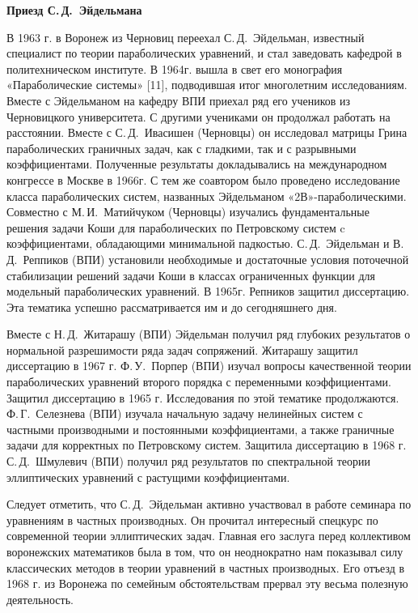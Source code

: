{\bf Приезд С.\,Д.~Эйдельмана}

В 1963 г. в Воронеж из Черновиц переехал С.\,Д.~Эйдельман, известный
специалист по теории параболических уравнений, и стал заведовать
кафедрой в политехническом институте. В 1964г. вышла в свет его монография «Параболические системы» [11], подводившая итог многолетним исследованиям. Вместе с Эйдельманом на кафедру ВПИ приехал ряд его учеников из Черновицкого университета. С другими учениками он продолжал работать на расстоянии. Вместе с С.\,Д.~Ивасишен (Черновцы) он исследовал матрицы Грина параболических граничных задач, как с гладкими, так и с разрывными коэффициентами. Полученные результаты докладывались на международном конгрессе в Москве в 1966г. С тем же соавтором было проведено исследование класса параболических систем, названных Эйдельманом «2В»-параболическими. Совместно с М.\,И.~Матийчуком (Черновцы) изучались фундаментальные
решения задачи Коши для параболических по Петровскому систем c коэффициентами, обладающими минимальной падкостью. С.\,Д.~Эйдельман и
В.\,Д.~Реппиков (ВПИ) установили необходимые и достаточные условия поточечной стабилизации решений задачи Коши в классах ограниченных функции для
модельный параболических уравнений. В 1965г. Репников защитил диссертацию. Эта тематика успешно рассматривается им и до сегодняшнего дня.

Вместе с Н.\,Д.~Житарашу (ВПИ) Эйдельман получил ряд глубоких результатов о нормальной разрешимости ряда задач сопряжений.
Житарашу защитил диссертацию в 1967 г.
Ф.\,У.~Порпер (ВПИ) изучал вопросы качественной теории параболических уравнений второго порядка с переменными коэффициентами.
Защитил диссертацию в 1965 г. Исследования по этой тематике продолжаются.
Ф.\,Г.~Селезнева (ВПИ) изучала начальную задачу нелинейных систем с частными производными и постоянными коэффициентами,
а также граничные задачи для корректных по Петровскому систем. Защитила диссертацию в 1968 г. С.\,Д.~Шмулевич (ВПИ) получил ряд результатов по спектральной теории эллиптических уравнений с растущими коэффициентами.

Следует отметить, что С.\,Д.~Эйдельман активно участвовал в работе семинара по уравнениям в частных производных. Он прочитал интересный спецкурс по современной теории эллиптических задач. Главная его заслуга перед коллективом воронежских математиков была в том, что он неоднократно нам показывал силу классических методов в теории уравнений в частных производных. Его отъезд в 1968 г. из Воронежа по семейным обстоятельствам прервал эту весьма полезную деятельность.

